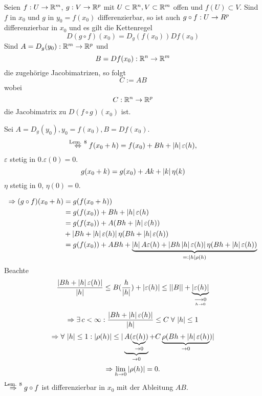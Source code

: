 \documentclass[../ana2.tex]{subfiles}
\begin{document}
\begin{satz}[Kettenregel]
    Seien \( f:U\rightarrow \mathbb{R}^m \), 
    \( g:V\rightarrow \mathbb{R}^p \)
    mit \( U \subset \mathbb{R}^n, V \subset \mathbb{R}^m \)
    offen und \( f(U) \subset V \).
    Sind \(f\) in \(x_0\) und \(g\) in \(y_0 = f(x_0)\)
    differenzierbar, so ist auch \(g \circ f:U\rightarrow R^p\)
    differenzierbar in \(x_0\) und es gilt die 
    Kettenregel 
    \[ D(g\circ f)(x_0) = D_g(f(x_0))Df(x_0) \]
    Sind \( A = D_g(y_0):\mathbb{R}^m\rightarrow \mathbb{R}^p \) und 
    \[ B = Df(x_0):\mathbb{R}^n\rightarrow \mathbb{R}^m \]
    die zugehörige Jacobimatrizen, so folgt 
    \[ C := AB \]
    wobei
    \[ C:\mathbb{R}^n\rightarrow \mathbb{R}^p \] 
    die Jacobimatrix zu \( D(f \circ g)(x_0) \) ist.
\end{satz}
\begin{bew}
    Sei \(A = D_g(y_0), y_0 = f(x_0), B = Df(x_0) \).
    \[ \overset{\text{Lem. 8}}{\Leftrightarrow} 
    f(x_0 + h) = f(x_0) + Bh + \left|h\right| \varepsilon(h), \]
    \( \varepsilon \) stetig in \(0. \varepsilon(0) = 0\).
    \[ g(x_0 + k) = g(x_0) + Ak + \left|k\right| \eta(k) \]
    \( \eta \) stetig in \( 0 \), \( \eta(0) = 0 \).

    \begin{align*}
        \Rightarrow (g \circ f)(x_0 + h) &= g(f(x_0 + h))\\
        &= g(f(x_0)) + Bh + \left|h\right|\varepsilon(h) \\
        &= g(f(x_0)) + A(Bh + \left|h\right|\varepsilon(h)) \\
        &+ \left| Bh + \left|h\right|\varepsilon(h) \right| \eta (Bh + \left|h\right|\varepsilon(h)) \\
        &= g(f(x_0)) + ABh + \underbrace{\left|h\right| A \varepsilon(h) + \left|Bh \left|h\right|\varepsilon(h)\right| \eta (Bh + \left|h\right|\varepsilon(h))}_{=:\left|h\right|\rho(h)}
    \end{align*}
    Beachte 
    \[ \frac{\left| Bh + \left|h\right|\varepsilon(h) \right|}{\left|h\right|}
    \leq B(\frac{h}{\left|h\right|}) + \left|\varepsilon(h)\right| 
    \leq \left|\left|B\right|\right| + \underbrace{\left|\varepsilon(h)\right|}_{\underset{h \rightarrow 0}{\longrightarrow 0}} \]
    \[ \Rightarrow \exists c < \infty: \frac{\abs{Bh + \abs{h}\varepsilon(h)}}{\abs{h}} 
    \leq C \; \forall \abs{h} \leq 1 \]
    \[ \Rightarrow \forall \abs{h} \leq 1: 
    \abs{\rho(h)} \leq | \underbrace{A(\underbrace{\varepsilon(h)}_{\rightarrow 0})}_{\rightarrow 0} 
    + C\underbrace{\rho (Bh + \abs{h}\varepsilon(h)}_{\rightarrow 0}) | \]    
    \[ \Rightarrow \lim\limits_{h\rightarrow{}0} \left|\rho(h)\right| = 0. \]
    \( \overset{\text{Lem. 8}}{\Rightarrow} g \circ f \) 
    ist differenzierbar in \(x_0\) mit der Ableitung \( AB \).
\end{bew}
\end{document}

